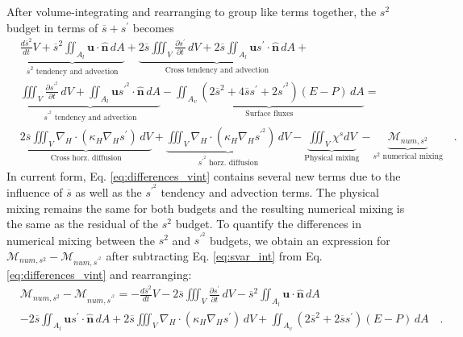 After volume-integrating and rearranging to group like terms together, the $s^2$ budget in terms of $\overline{s}+s^\prime$ becomes
\begin{equation} \label{eq:differences_vint}
    \begin{split}
        & \underbrace{\frac{d \overline{s}^2}{d t} V + \overline{s}^2 \iint_{A_l} \mathbf{u} \cdot \hat{\mathbf{n}} \, dA}_\text{$\overline{s}^2$ tendency and advection}+ \underbrace{2\overline{s} \iiint_V \frac{\partial s^\prime}{\partial t} \, dV+2\overline{s}\iint_{A_l} \mathbf{u}s^{\prime} \cdot \hat{\mathbf{n}} \, dA}_\text{Cross tendency and advection} + \\
        & \underbrace{\iiint_V \frac{\partial s^{\prime^2}}{\partial t} \, dV+\iint_{A_l}  \mathbf{u}s^{\prime^2} \cdot \hat{\mathbf{n}} \, dA}_\text{$s^{\prime^2}$ tendency and advection}-\underbrace{\iint_{A_{v}} \left(2\overline{s}^2+4 \overline{s} s^\prime+2s^{\prime^2} \right)(E-P) \, dA}_\text{Surface fluxes} = \\ 
        & 
        \underbrace{2 \overline{s} \iiint_{V} \nabla_H \cdot \left(\kappa_H \nabla_H s^{\prime} \right) \, dV}_{\text{Cross horz. diffusion}}+
        \underbrace{\iiint_{V} \nabla_H \cdot \left(\kappa_H \nabla_H s^{\prime^2} \right) \, dV}_{\text{$s^{\prime^2}$ horz. diffusion}}-\underbrace{\iiint_V \chi^s dV}_\text{Physical mixing} - \underbrace{\mathcal{M}_{num, s^2}}_\text{$s^2$ numerical mixing} \quad . 
\end{split}
\end{equation}
In current form, Eq. \ref{eq:differences_vint} contains several new terms due to the influence of $\overline{s}$ as well as the $s^{\prime^2}$ tendency and advection terms. The physical mixing remains the same for both budgets and the resulting numerical mixing is the same as the residual of the $s^2$ budget. To quantify the differences in numerical mixing between the $s^2$ and $s^{\prime^2}$ budgets, we obtain an expression for $\mathcal{M}_{num, s^2}-\mathcal{M}_{num, s^{\prime^2}}$ after subtracting Eq. \ref{eq:svar_int} from Eq. \ref{eq:differences_vint} and rearranging:
\begin{equation} \label{eq:differences}
    \begin{split}
    & \mathcal{M}_{num, s^2} - \mathcal{M}_{num, s^{\prime^2}}=-\frac{d \overline{s}^2}{d t} V   - 2\overline{s} \iiint_V \frac{\partial s^\prime}{\partial t} \, dV- \overline{s}^2 \iint_{A_l} \mathbf{u} \cdot \hat{\mathbf{n}} \, dA  \\ 
    & -2 \overline{s} \iint_{A_l} \mathbf{u}s^{\prime} \cdot \hat{\mathbf{n}} \, dA  + 2 \overline{s} \iiint_{V} \nabla_H \cdot \left(\kappa_H \nabla_H s^{\prime} \right) \, dV + \iint_{A_v} \left(2\overline{s}^2+2 \overline{s} s^\prime \right)(E-P) \, dA \quad .
    \end{split}
\end{equation}
